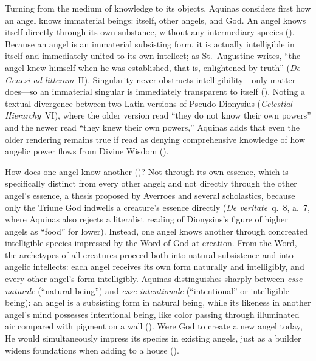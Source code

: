 Turning from the medium of knowledge to its objects, Aquinas considers first how an angel knows immaterial beings: itself, other angels, and God. An angel knows itself directly through its own substance, without any intermediary species (). Because an angel is an immaterial subsisting form, it is actually intelligible in itself and immediately united to its own intellect; as St.~Augustine writes, ``the angel knew himself when he was established, that is, enlightened by truth'' (\emph{De Genesi ad litteram}~II). Singularity never obstructs intelligibility---only matter does---so an immaterial singular is immediately transparent to itself (). Noting a textual divergence between two Latin versions of Pseudo-Dionysius (\emph{Celestial Hierarchy}~VI), where the older version read ``they do not know their own powers'' and the newer read ``they knew their own powers,'' Aquinas adds that even the older rendering remains true if read as denying comprehensive knowledge of how angelic power flows from Divine Wisdom ().

How does one angel know another ()? Not through its own essence, which is specifically distinct from every other angel; and not directly through the other angel's essence, a thesis proposed by Averroes and several scholastics, because only the Triune God indwells a creature's essence directly (\emph{De veritate}~q.~8, a.~7, where Aquinas also rejects a literalist reading of Dionysius's figure of higher angels as ``food'' for lower). Instead, one angel knows another through concreated intelligible species impressed by the Word of God at creation. From the Word, the archetypes of all creatures proceed both into natural subsistence and into angelic intellects: each angel receives its own form naturally and intelligibly, and every other angel's form intelligibly. Aquinas distinguishes sharply between \emph{esse naturale} (``natural being'') and \emph{esse intentionale} (``intentional'' or intelligible being): an angel is a subsisting form in natural being, while its likeness in another angel's mind possesses intentional being, like color passing through illuminated air compared with pigment on a wall (). Were God to create a new angel today, He would simultaneously impress its species in existing angels, just as a builder widens foundations when adding to a house ().

